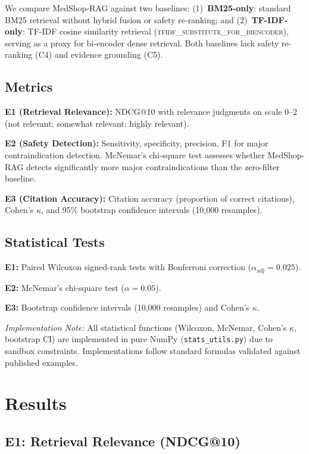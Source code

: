 \documentclass[conference]{IEEEtran}
\begin{document}
We compare MedShop-RAG against two baselines: (1)~\textbf{BM25-only}: standard
BM25 retrieval without hybrid fusion or safety re-ranking; and
(2)~\textbf{TF-IDF-only}: TF-IDF cosine similarity retrieval
(\textsc{tfidf\_substitute\_for\_biencoder}), serving as a proxy for bi-encoder
dense retrieval. Both baselines lack safety re-ranking (C4) and evidence
grounding (C5).

\subsection{Metrics}

\textbf{E1 (Retrieval Relevance):} NDCG@10 with relevance judgments on scale
0--2 (not relevant; somewhat relevant; highly relevant).

\textbf{E2 (Safety Detection):} Sensitivity, specificity, precision, F1 for
major contraindication detection. McNemar's chi-square test assesses whether
MedShop-RAG detects significantly more major contraindications than the
zero-filter baseline.

\textbf{E3 (Citation Accuracy):} Citation accuracy (proportion of correct
citations), Cohen's $\kappa$, and 95\% bootstrap confidence intervals (10,000
resamples).

\subsection{Statistical Tests}

\textbf{E1:} Paired Wilcoxon signed-rank tests with Bonferroni correction
($\alpha_{\text{adj}} = 0.025$).

\textbf{E2:} McNemar's chi-square test ($\alpha = 0.05$).

\textbf{E3:} Bootstrap confidence intervals (10,000 resamples) and Cohen's
$\kappa$.

\textit{Implementation Note:} All statistical functions (Wilcoxon, McNemar,
Cohen's $\kappa$, bootstrap CI) are implemented in pure NumPy (\texttt{stats\_utils.py})
due to sandbox constraints. Implementations follow standard formulas validated
against published examples.

\section{Results}
\label{sec:results}

\subsection{E1: Retrieval Relevance (NDCG@10)}
\end{document}
